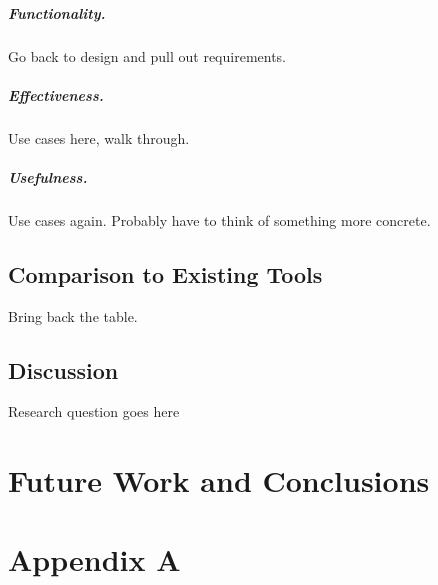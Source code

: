 \documentclass[a4paper, 11pt, titlepage, onehalfspacing]{report}
\begin{document}
\paragraph{Functionality.} Go back to design and pull out requirements.

\paragraph{Effectiveness.} Use cases here, walk through.

\paragraph{Usefulness.} Use cases again. Probably have to think of something more concrete.

\section{Comparison to Existing Tools}
Bring back the table.


\section{Discussion}
Research question goes here


\chapter{Future Work and Conclusions}




\appendix
\chapter{Appendix A}
\end{document}
